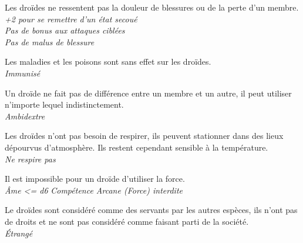 \begin{description}[align=left]
\item [Créature artificielle] 	%
		Les droïdes ne ressentent pas la douleur de blessures ou de la perte d’un membre.\\
		\emph{+2 pour se remettre d’un état secoué}\\
		\emph{Pas de bonus aux attaques ciblées}\\
		\emph{Pas de malus de blessure}

\item [Immunisé] 				%
		Les maladies et les poisons sont sans effet sur les droïdes.\\
		\emph{Immunisé}

\item [Ambidextre] 				%
		Un droïde ne fait pas de différence entre un membre et un autre, il peut utiliser n’importe lequel indistinctement.\\
		\emph{Ambidextre}

\item [Manque pas d’air] 		%
		Les droïdes n’ont pas besoin de respirer, ils peuvent stationner dans des lieux dépourvus d’atmosphère. Ils restent cependant sensible à la température.\\
		\emph{Ne respire pas}

\item [Pas d’\^Ame] 			%
		Il est impossible pour un droïde d’utiliser la force.\\
		\emph{\^Ame <= d6}
		\emph{Compétence Arcane (Force) interdite}

\item [Outsider] 				%
		Le droïdes sont considéré comme des servants par les autres espèces, ils n’ont pas de droits et ne sont pas considéré comme faisant parti de la société.\\
		\emph{\'Etrangé}
\end{description}
